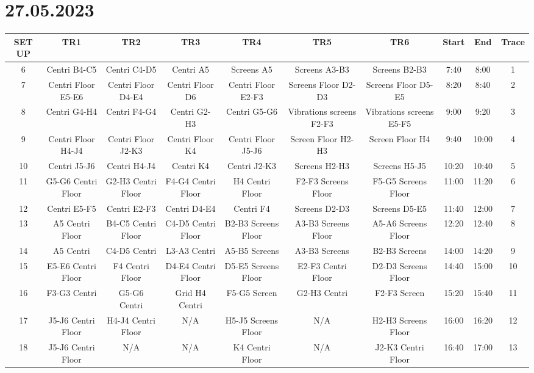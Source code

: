 \documentclass[8pt]{article}
\begin{document}
\section*{27.05.2023}
\tiny
\begin{tabular}{|c|c|c|c|c|c|c|c|c|c|}
\hline
SET UP & TR1 & TR2 & TR3 & TR4 & TR5 & TR6 & Start & End & Trace\\
\hline
6 & Centri B4-C5 & Centri C4-D5 & Centri A5 & Screens A5 & Screens A3-B3 & Screens B2-B3 & 7:40 & 8:00 & 1\\
7 & Centri Floor E5-E6 & Centri Floor D4-E4 & Centri Floor D6 & Centri Floor E2-F3 & Screens Floor D2-D3 & Screens Floor D5-E5 & 8:20 & 8:40 & 2\\
8 & Centri G4-H4 & Centri F4-G4 & Centri G2-H3 & Centri G5-G6 & Vibrations screens F2-F3 & Vibrations screens E5-F5 & 9:00 & 9:20 & 3\\
9 & Centri Floor H4-J4 & Centri Floor J2-K3 & Centri Floor K4 & Centri Floor J5-J6 & Screen Floor H2-H3 & Screen Floor H4 & 9:40 & 10:00 & 4\\
10 & Centri J5-J6 & Centri H4-J4 & Centri K4 & Centri J2-K3 & Screens H2-H3 & Screens H5-J5 & 10:20 & 10:40 & 5\\
11 & G5-G6 Centri Floor & G2-H3 Centri Floor & F4-G4 Centri Floor & H4 Centri Floor & F2-F3 Screens Floor & F5-G5 Screens Floor & 11:00 & 11:20 & 6\\
12 & Centri E5-F5 & Centri E2-F3 & Centri D4-E4 & Centri F4 & Screens D2-D3 & Screens D5-E5 & 11:40 & 12:00 & 7\\
13 & A5 Centri Floor & B4-C5 Centri Floor & C4-D5 Centri Floor & B2-B3 Screens Floor & A3-B3 Screens Floor & A5-A6 Screens Floor & 12:20 & 12:40 & 8\\
14 & A5 Centri & C4-D5 Centri & L3-A3 Centri & A5-B5 Screens & A3-B3 Screens & B2-B3 Screens & 14:00 & 14:20 & 9\\
15 & E5-E6 Centri Floor & F4 Centri Floor & D4-E4 Centri Floor & D5-E5 Screens Floor & E2-F3 Centri Floor & D2-D3 Screens Floor & 14:40 & 15:00 & 10\\
16 & F3-G3 Centri & G5-G6 Centri & Grid H4 Centri & F5-G5 Screen & G2-H3 Centri & F2-F3 Screen & 15:20 & 15:40 & 11\\
17 & J5-J6 Centri Floor & H4-J4 Centri Floor & N/A & H5-J5 Screens Floor & N/A & H2-H3 Screens Floor & 16:00 & 16:20 & 12\\
18 & J5-J6 Centri Floor & N/A & N/A & K4 Centri Floor & N/A & J2-K3 Centri Floor & 16:40 & 17:00 & 13\\
\hline
\end{tabular}
\normalsize
\end{document}
